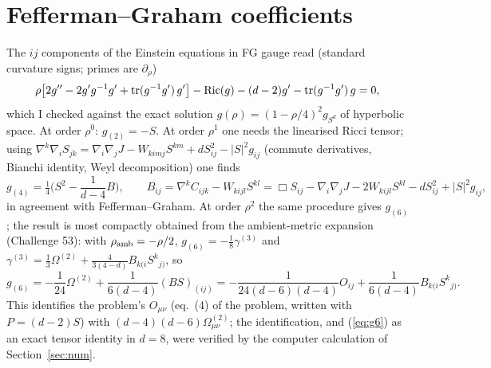 \section{Fefferman--Graham coefficients}
The $ij$ components of the Einstein equations in FG gauge read (standard curvature signs; primes are $\partial_\rho$)
\begin{equation}
\rho\big[2g''-2g'g^{-1}g'+\operatorname{tr}(g^{-1}g')\,g'\big]-{\rm Ric}(g)-(d-2)g'-\operatorname{tr}(g^{-1}g')\,g=0,
\label{eq:FG}
\end{equation}
which I checked against the exact solution $g(\rho)=(1-\rho/4)^2g_{S^d}$ of hyperbolic space. At order $\rho^0$: $g_{(2)}=-S$. At order $\rho^1$ one needs the linearised Ricci tensor; using
$\nabla^k\nabla_iS_{jk}=\nabla_i\nabla_jJ-W_{kimj}S^{km}+dS^2_{ij}-|S|^2g_{ij}$ (commute derivatives, Bianchi identity, Weyl decomposition) one finds
\begin{equation}
g_{(4)}=\tfrac14\Big(S^2-\frac{1}{d-4}B\Big),\qquad B_{ij}=\nabla^kC_{ijk}-W_{kijl}S^{kl}=\Box S_{ij}-\nabla_i\nabla_jJ-2W_{kijl}S^{kl}-dS^2_{ij}+|S|^2g_{ij},
\end{equation}
in agreement with Fefferman--Graham. At order $\rho^2$ the same procedure gives $g_{(6)}$; the result is most compactly obtained from the ambient-metric expansion (Challenge 53): with $\rho_{\rm amb}=-\rho/2$, $g_{(6)}=-\frac18\gamma^{(3)}$ and $\gamma^{(3)}=\frac13\Omega^{(2)}+\frac{4}{3(4-d)}B_{k(i}S^k{}_{j)}$, so
\begin{equation}
g_{(6)}=-\frac{1}{24}\Omega^{(2)}+\frac{1}{6(d-4)}(BS)_{(ij)}
=-\frac{1}{24(d-6)(d-4)}O_{ij}+\frac{1}{6(d-4)}B_{k(i}S^k{}_{j)} .
\label{eq:g6}
\end{equation}
This identifies the problem's $O_{\mu\nu}$ (eq.~(4) of the problem, written with $P=(d-2)S$) with $(d-4)(d-6)\Omega^{(2)}_{\mu\nu}$; the identification, and (\ref{eq:g6}) as an exact tensor identity in $d=8$, were verified by the computer calculation of Section~\ref{sec:num}.

